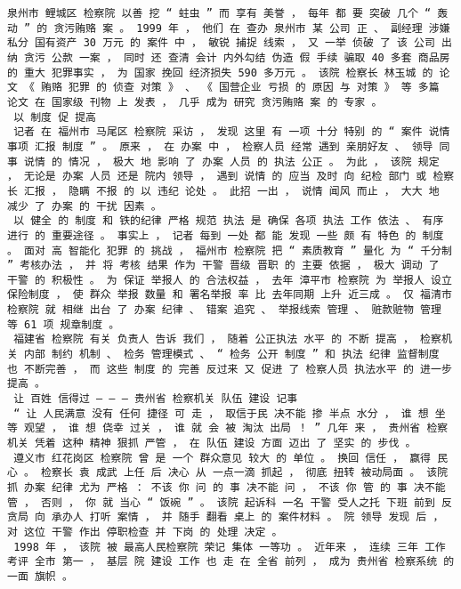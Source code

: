\documentclass{article}
\begin{document}
\begin{Verbatim}[commandchars=\\\{\}]
 泉州市 鲤城区 检察院 以善 挖 “ 蛀虫 ” 而 享有 美誉 ， 每年 都 要 突破 几个 “ 轰动 ” 的 贪污贿赂 案 。 1999 年 ， 他们 在 查办 泉州市 某 公司 正 、 副经理 涉嫌 私分 国有资产 30 万元 的 案件 中 ， 敏锐 捕捉 线索 ， 又 一举 侦破 了 该 公司 出纳 贪污 公款 一案 ， 同时 还 查清 会计 内外勾结 伪造 假 手续 骗取 40 多套 商品房 的 重大 犯罪事实 ， 为 国家 挽回 经济损失 590 多万元 。 该院 检察长 林玉城 的 论文 《 贿赂 犯罪 的 侦查 对策 》 、 《 国营企业 亏损 的 原因 与 对策 》 等 多篇 论文 在 国家级 刊物 上 发表 ， 几乎 成为 研究 贪污贿赂 案 的 专家 。 
 以 制度 促 提高 
 记者 在 福州市 马尾区 检察院 采访 ， 发现 这里 有 一项 十分 特别 的 “ 案件 说情 事项 汇报 制度 ” 。 原来 ， 在 办案 中 ， 检察人员 经常 遇到 亲朋好友 、 领导 同事 说情 的 情况 ， 极大 地 影响 了 办案 人员 的 执法 公正 。 为此 ， 该院 规定 ， 无论是 办案 人员 还是 院内 领导 ， 遇到 说情 的 应当 及时 向 纪检 部门 或 检察长 汇报 ， 隐瞒 不报 的 以 违纪 论处 。 此招 一出 ， 说情 闻风 而止 ， 大大 地 减少 了 办案 的 干扰 因素 。 
 以 健全 的 制度 和 铁的纪律 严格 规范 执法 是 确保 各项 执法 工作 依法 、 有序 进行 的 重要途径 。 事实上 ， 记者 每到 一处 都 能 发现 一些 颇 有 特色 的 制度 。 面对 高 智能化 犯罪 的 挑战 ， 福州市 检察院 把 “ 素质教育 ” 量化 为 “ 千分制 ” 考核办法 ， 并 将 考核 结果 作为 干警 晋级 晋职 的 主要 依据 ， 极大 调动 了 干警 的 积极性 。 为 保证 举报人 的 合法权益 ， 去年 漳平市 检察院 为 举报人 设立 保险制度 ， 使 群众 举报 数量 和 署名举报 率 比 去年同期 上升 近三成 。 仅 福清市 检察院 就 相继 出台 了 办案 纪律 、 错案 追究 、 举报线索 管理 、 赃款赃物 管理 等 61 项 规章制度 。 
 福建省 检察院 有关 负责人 告诉 我们 ， 随着 公正执法 水平 的 不断 提高 ， 检察机关 内部 制约 机制 、 检务 管理模式 、 “ 检务 公开 制度 ” 和 执法 纪律 监督制度 也 不断完善 ， 而 这些 制度 的 完善 反过来 又 促进 了 检察人员 执法水平 的 进一步提高 。 
 让 百姓 信得过 — — — 贵州省 检察机关 队伍 建设 记事 
 “ 让 人民满意 没有 任何 捷径 可 走 ， 取信于民 决不能 掺 半点 水分 ， 谁 想 坐等 观望 ， 谁 想 侥幸 过关 ， 谁 就 会 被 淘汰 出局 ！ ” 几年 来 ， 贵州省 检察机关 凭着 这种 精神 狠抓 严管 ， 在 队伍 建设 方面 迈出 了 坚实 的 步伐 。 
 遵义市 红花岗区 检察院 曾 是 一个 群众意见 较大 的 单位 。 换回 信任 ， 赢得 民心 。 检察长 袁 成武 上任 后 决心 从 一点一滴 抓起 ， 彻底 扭转 被动局面 。 该院 抓 办案 纪律 尤为 严格 ： 不该 你 问 的 事 决不能 问 ， 不该 你 管 的 事 决不能 管 ， 否则 ， 你 就 当心 “ 饭碗 ” 。 该院 起诉科 一名 干警 受人之托 下班 前到 反贪局 向 承办人 打听 案情 ， 并 随手 翻看 桌上 的 案件材料 。 院 领导 发现 后 ， 对 这位 干警 作出 停职检查 并 下岗 的 处理 决定 。 
 1998 年 ， 该院 被 最高人民检察院 荣记 集体 一等功 。 近年来 ， 连续 三年 工作 考评 全市 第一 ， 基层 院 建设 工作 也 走 在 全省 前列 ， 成为 贵州省 检察系统 的 一面 旗帜 。 

\end{Verbatim}
\end{document}
